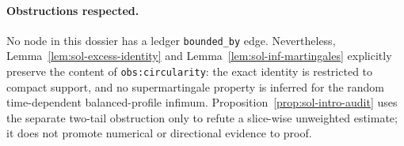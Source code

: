 \documentclass[../main.tex]{subfiles}
\begin{document}
\paragraph{Obstructions respected.}
No node in this dossier has a ledger \texttt{bounded\_by} edge.  Nevertheless,
Lemma~\ref{lem:sol-excess-identity} and Lemma~\ref{lem:sol-inf-martingales} explicitly preserve
the content of \texttt{obs:circularity}: the exact identity is restricted to compact support,
and no supermartingale property is inferred for the random time-dependent balanced-profile
infimum.  Proposition~\ref{prop:sol-intro-audit} uses the separate two-tail obstruction only
to refute a slice-wise unweighted estimate; it does not promote numerical or directional
evidence to proof.
\end{document}
